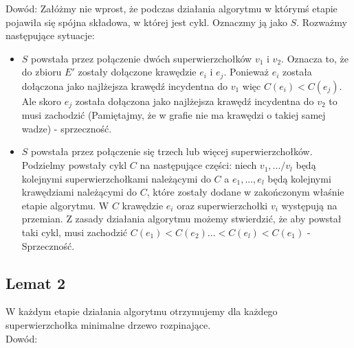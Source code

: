 \documentclass[svgnames]{report}
\begin{document}
\noindent Dowód: Załóżmy nie wprost, że podczas działania algorytmu w którymś etapie pojawiła się spójna składowa, w której jest cykl. Oznaczmy ją jako $S$. Rozważmy następujące sytuacje:\\

\begin{itemize}
\item $S$ powstała przez połączenie dwóch superwierzchołków $v_1$ i $v_2$. Oznacza to, że do zbioru $E'$ zostały dołączone krawędzie $e_i$ i $e_j$. Ponieważ $e_i$ została dołączona jako najlżejsza krawędź incydentna do $v_1$ więc $C(e_i) < C(e_j)$. Ale skoro $e_j$ została dołączona jako najlżejsza krawędź incydentna do $v_2$ to musi zachodzić  (Pamiętajmy, że w grafie nie ma krawędzi o takiej samej wadze) - sprzeczność.

\item $S$ powstała przez połączenie się trzech lub więcej superwierzchołków. Podzielmy powstały cykl $C$ na następujące części: niech $v_1,.../v_l$ będą kolejnymi superwierzchołkami należącymi do $C$ a $e_1,...,e_l$ będą kolejnymi krawędziami należącymi do $C$, które zostały dodane w zakończonym właśnie etapie algorytmu. W $C$ krawędzie $e_i$ oraz superwierzchołki $v_i$ występują na przemian. Z zasady działania algorytmu możemy stwierdzić, że aby powstał taki cykl, musi zachodzić $C(e_1) < C(e_2) ... < C(e_l) < C(e_1)$ - Sprzeczność.
\end{itemize}

\subsection{Lemat 2}

\noindent W każdym etapie działania algorytmu otrzymujemy dla każdego superwierzchołka minimalne drzewo rozpinające.\\

\noindent Dowód:
\end{document}
